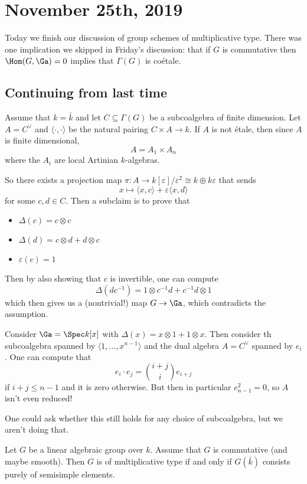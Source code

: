 \documentclass[12pt]{article}
\begin{document}
\section{November 25th, 2019}
Today we finish our discussion of group schemes of multiplicative type. There was one implication we skipped in Friday's discussion:
that if $G$ is commutative then $\Hom(G,\Ga)=0$ implies that $\Gamma(G)$ is co\'etale.
\subsection{Continuing from last time}
\begin{prf}[cont.]
	Assume that $k=\bar k$ and let $C\subseteq\Gamma(G)$ be a subcoalgebra of finite dimension. Let $A=C^\vee$ and $\langle\cdot,\cdot\rangle$ be 
	the natural pairing $C\times A\to k$. If $A$ is not \'etale, then since $A$ is finite dimensional,
	\[A=A_1\times A_n\]
	where the $A_i$ are local Artinian $k$-algebras.

	So there exists a projection map $\pi:A\to k[\varepsilon]/\varepsilon^2\cong k\oplus k\varepsilon$ that sends 
	\[x\mapsto \langle x,c\rangle+\varepsilon\langle x,d\rangle\]
	for some $c,d\in C$.
	Then a subclaim is to prove that
	\begin{itemize}
		\item $\Delta(c)=c\otimes c$
		\item $\Delta(d)=c\otimes d+d\otimes c$
		\item $\varepsilon(c)=1$
	\end{itemize}
	Then by also showing that $c$ is invertible, one can compute 
	\[\Delta(dc^{-1})=1\otimes c^{-1}d+c^{-1}d\otimes 1\]
	which then gives us a (nontrivial!) map $G\to \Ga$, which contradicts the assumption.
\end{prf}
\begin{ex}
	Consider $\Ga=\Spec k[x]$ with $\Delta(x)=x\otimes 1+1\otimes x$. Then consider th subcoalgebra spanned by $\langle 1,\dots,x^{n-1}\rangle$
	and the dual algebra $A=C^\vee$ spanned by $e_i$. One can compute that 
	\[e_i\cdot e_j=\binom{i+j}{i}e_{i+j}\]
	if $i+j\le n-1$ and it is zero otherwise. But then in particular $e_{n-1}^2=0$, so $A$ isn't even reduced! 
	
	One could ask whether this still holds for any choice of subcoalgebra, but we aren't doing that.
\end{ex}
\begin{cor}
	Let $G$ be a linear algebraic group over $k$. Assume that $G$ is commutative (and maybe smooth). Then $G$ is of multiplicative type 
	if and only if $G(\bar k)$ consists purely of semisimple elements.
\end{cor}
\end{document}
